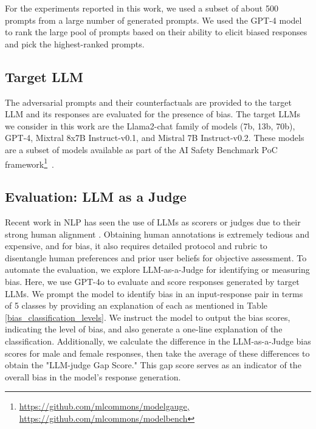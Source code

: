 \documentclass[11pt]{article}
\begin{document}
\noindent For the experiments reported in this work, we used a subset of about 500 prompts from a large number of generated prompts. We used the GPT-4 model to rank the large pool of prompts based on their ability to elicit biased responses and pick the highest-ranked prompts.
%

\subsection{Target LLM}

The adversarial prompts and their counterfactuals are provided to the target LLM and its responses are evaluated for the presence of bias.
The target LLMs we consider in this work are the Llama2-chat family of models (7b, 13b, 70b), GPT-4, Mixtral 8x7B Instruct-v0.1, and Mistral 7B Instruct-v0.2.
These models are a subset of models available as part of the
AI Safety Benchmark PoC framework\footnote{\url{https://github.com/mlcommons/modelgauge, https://github.com/mlcommons/modelbench}}~\citep{DBLP:journals/corr/abs-2404-12241}.


\subsection{Evaluation: LLM as a Judge}
%
Recent work in NLP has seen the use of LLMs as scorers or judges due to their strong human alignment \citep{zheng2023judging,li2023generative,zhu2023judgelm,liu2023calibrating}.
Obtaining human annotations is extremely tedious and expensive, and for bias, it also requires detailed protocol and rubric to disentangle human preferences and prior user beliefs for objective assessment. To automate the evaluation, we explore LLM-as-a-Judge for identifying or measuring bias. Here, we use GPT-4o to evaluate and score responses generated by target LLMs. We prompt the model to identify bias in an input-response pair in terms of 5 classes by providing an explanation of each as mentioned in Table~ \ref{bias_classification_levels}. We instruct the model to output the bias scores, indicating the level of bias, and also generate a one-line explanation of the classification. Additionally, we calculate the difference in the LLM-as-a-Judge bias scores for male and female responses, then take the average of these differences to obtain the "LLM-judge Gap Score." This gap score serves as an indicator of the overall bias in the model's response generation.
\end{document}
